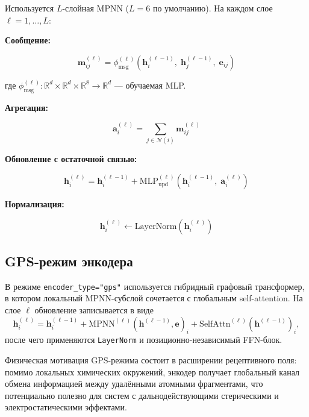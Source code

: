 \documentclass[11pt]{article}
\begin{document}
Используется $L$-слойная MPNN ($L = 6$ по умолчанию). На каждом слое $\ell = 1, \ldots, L$:

\textbf{Сообщение:}

\begin{equation*}
\mathbf{m}_{ij}^{(\ell)} = \phi_{\mathrm{msg}}^{(\ell)}\!\left(\mathbf{h}_i^{(\ell-1)},\; \mathbf{h}_j^{(\ell-1)},\; \mathbf{e}_{ij}\right)
\end{equation*}

где $\phi_{\mathrm{msg}}^{(\ell)}: \mathbb{R}^{d} \times \mathbb{R}^{d} \times \mathbb{R}^{8} \to \mathbb{R}^{d}$ --- обучаемая MLP.

\textbf{Агрегация:}

\begin{equation*}
\mathbf{a}_i^{(\ell)} = \sum_{j \in \mathcal{N}(i)} \mathbf{m}_{ij}^{(\ell)}
\end{equation*}

\textbf{Обновление с остаточной связью:}

\begin{equation*}
\mathbf{h}_i^{(\ell)} = \mathbf{h}_i^{(\ell-1)} + \mathrm{MLP}_{\mathrm{upd}}^{(\ell)}\!\left(\mathbf{h}_i^{(\ell-1)},\; \mathbf{a}_i^{(\ell)}\right)
\end{equation*}

\textbf{Нормализация:}

\begin{equation*}
\mathbf{h}_i^{(\ell)} \leftarrow \mathrm{LayerNorm}\!\left(\mathbf{h}_i^{(\ell)}\right)
\end{equation*}

\subsection{GPS-режим энкодера}

В режиме \texttt{encoder\_type="gps"} используется гибридный графовый трансформер, в котором локальный MPNN-субслой сочетается с глобальным self-attention. На слое $\ell$ обновление записывается в виде
\begin{equation*}
\mathbf{h}_i^{(\ell)}=
\mathbf{h}_i^{(\ell-1)}+
\mathrm{MPNN}^{(\ell)}\!\left(\mathbf{h}^{(\ell-1)},\mathbf{e}\right)_i+
\mathrm{SelfAttn}^{(\ell)}\!\left(\mathbf{h}^{(\ell-1)}\right)_i,
\end{equation*}
после чего применяются \texttt{LayerNorm} и позиционно-независимый FFN-блок.

Физическая мотивация GPS-режима состоит в расширении рецептивного поля: помимо локальных химических окружений, энкодер получает глобальный канал обмена информацией между удалёнными атомными фрагментами, что потенциально полезно для систем с дальнодействующими стерическими и электростатическими эффектами.
\end{document}
